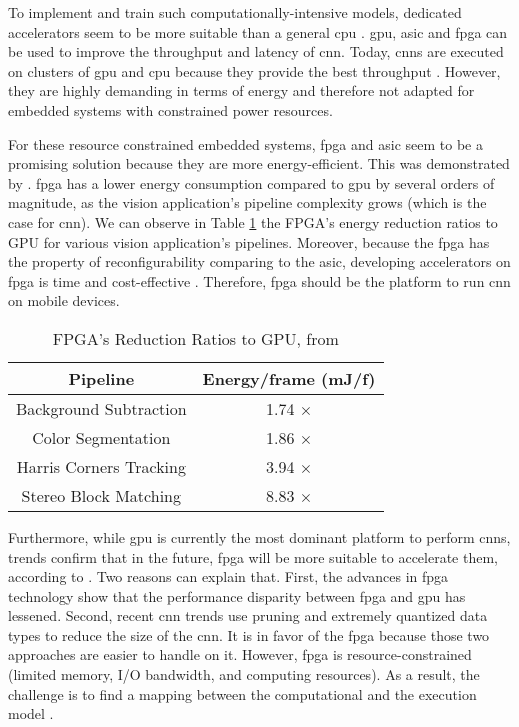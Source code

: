 To implement and train such computationally-intensive models, dedicated accelerators seem to be more suitable than a general \acrfull{cpu} \cite{liu_fpga-based_2019}. \acrfull{gpu}, \acrfull{asic} and \acrfull{fpga} can be used to improve the throughput and latency of \acrshort{cnn}. Today, \acrshort{cnn}s are executed on clusters of \acrshort{gpu} and \acrshort{cpu} because they provide the best throughput \cite{liu_uniform_2019}. However, they are highly demanding in terms of energy and therefore not adapted for embedded systems with constrained power resources.

For these resource constrained embedded systems, \acrshort{fpga} and \acrshort{asic} seem to be a promising solution because they are more energy-efficient. This was demonstrated by \textcite{qasaimeh_comparing_2019}. \acrshort{fpga} has a lower energy consumption compared to \acrshort{gpu} by several orders of magnitude, as the vision application’s pipeline complexity grows (which is the case for \acrshort{cnn}). We can observe in Table \ref{tab:benchener} the FPGA’s energy reduction ratios to GPU for various vision application’s pipelines. Moreover, because the \acrshort{fpga} has the property of reconfigurability comparing to the \acrshort{asic}, developing accelerators on \acrshort{fpga} is time and cost-effective \cite{motamedi_placid_2017}. Therefore, \acrshort{fpga} should be the platform to run \acrshort{cnn} on mobile devices.
%
\begin{table}[H]
    \center
    \begin{tabular}{|c|c|}
        \hline
        Pipeline & Energy/frame (mJ/f) \\
        \hline
        Background Subtraction & 1.74 $\times$\\
        \hline
        Color Segmentation & 1.86 $\times$ \\
        \hline
        Harris Corners Tracking & 3.94 $\times$ \\
        \hline
        Stereo Block Matching & 8.83 $\times$ \\
        \hline
    \end{tabular}
    \caption{FPGA’s Reduction Ratios to GPU, from \cite{qasaimeh_comparing_2019}}
    \label{tab:benchener}
\end{table}

Furthermore, while \acrshort{gpu} is currently the most dominant platform to perform \acrshort{cnn}s, trends confirm that in the future, \acrshort{fpga} will be more suitable to accelerate them, according to \textcite{nurvitadhi_can_2017}. Two reasons can explain that. First, the advances in \acrshort{fpga} technology show that the performance disparity between \acrshort{fpga} and \acrshort{gpu} has lessened. Second, recent \acrshort{cnn} trends use pruning and extremely quantized data types to reduce the size of the \acrshort{cnn}. It is in favor of the \acrshort{fpga} because those two approaches are easier to handle on it. However, \acrshort{fpga} is resource-constrained (limited memory, I/O bandwidth, and computing resources). As a result, the challenge is to find a mapping between the computational and the execution model \cite{morcel_feathernet_2019}.

